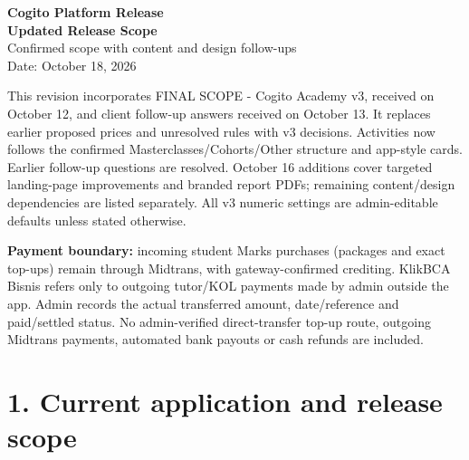\documentclass[11pt,a4paper]{article}
\begin{document}
\begin{center}
{\LARGE \textbf{Cogito Platform Release}}\\[4pt]
{\Large \textbf{Updated Release Scope}}\\[8pt]
{\normalsize Confirmed scope with content and design follow-ups}\\
{\normalsize Date: October 18, 2026}
\end{center}
\vspace{1em}


This revision incorporates FINAL SCOPE - Cogito Academy v3, received on October 12, and client follow-up answers received on October 13. It replaces earlier proposed prices and unresolved rules with v3 decisions. Activities now follows the confirmed Masterclasses/\allowbreak{}Cohorts/\allowbreak{}Other structure and app-style cards. Earlier follow-up questions are resolved. October 16 additions cover targeted landing-page improvements and branded report PDFs; remaining content/\allowbreak{}design dependencies are listed separately. All v3 numeric settings are admin-editable defaults unless stated otherwise.

\textbf{Payment boundary:} incoming student Marks purchases (packages and exact top-ups) remain through Midtrans, with gateway-confirmed crediting. KlikBCA Bisnis refers only to outgoing tutor/\allowbreak{}KOL payments made by admin outside the app. Admin records the actual transferred amount, date/\allowbreak{}reference and paid/\allowbreak{}settled status. No admin-verified direct-transfer top-up route, outgoing Midtrans payments, automated bank payouts or cash refunds are included.

\section*{1. Current application and release scope}
\end{document}
